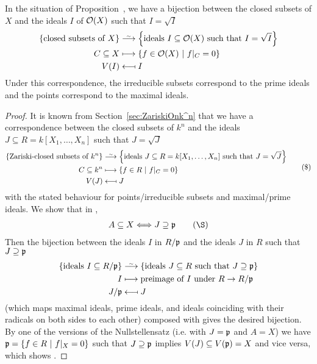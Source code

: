 \documentclass[a4paper,parskip=half,numbers=enddot, DIV=12]{scrreprt}
\begin{document}
	\begin{cor}
	 In the situation of Proposition~, we have a bijection between the closed subsets of $X$ and the ideals $I$ of $\mathcal{O}(X)$ such that $I=\sqrt{I}$
	 \begin{align*}
	 	\left\{\text{closed subsets of } X\right\}&\isomorphism\left\{	 	\text{ideals }I\subseteq\Oo(X)\text{ such that }I=\sqrt{I}
	 	\right\}\\
	   C\subseteq X &\longmapsto \left\{f\in\Oo(X)\st f|_C =0\right\}\\
	   V(I) &\longmapsfrom I
	 \end{align*}
	 Under this correspondence, the irreducible subsets correspond to the prime ideals and the points correspond to the maximal ideals.
	\end{cor}
	\begin{proof}
	 It is known from Section~\ref{sec:ZariskiOnk^n} that we have a correspondence between the closed subsets of $k^n$ and the ideals $J\subseteq R=  k[X_1,\ldots,X_n]$ such that $J=\sqrt{J}$
	 \begin{align*}\lbl{eq:correspondenceClosedIdeals}
	 \begin{split}
	 \left\{\text{Zariski-closed subsets of }k^n\right\}&\isomorphism\left\{\text{ideals }J\subseteq R=k[X_1,\ldots,X_n]\text{ such that }J=\sqrt J\right\}\\
	 C\subseteq k^n &\longmapsto \left\{f\in R\st f|_C =0\right\}\\
	 V(J) &\longmapsfrom J 
	 \end{split}\tag{\$} 
	 \end{align*}
	 with the stated behaviour for points/irreducible subsets and maximal/prime ideals. We show that in ,
	 \begin{align*}\lbl{eq:cor2.2.2+}
	   A\subseteq X \Longleftrightarrow J\supseteq \pp \tag{\S}
	 \end{align*}
	 Then the bijection between the ideals $I$ in $R/\mathfrak{p}$ and the ideals $J$ in $R$ such that $J\supseteq \mathfrak{p}$ 
	 \begin{align*}
	 \left\{\text{ideals }I\subseteq R/\pp\right\}&\isomorphism\left\{\text{ideals }J\subseteq R\text{ such that }J\supseteq\pp\right\}\\
	 I&\longmapsto \text{preimage of }I\text{ under }R\to R/\pp\\
	 J/\pp &\longmapsfrom J
	 \end{align*}
	 (which maps maximal ideals, prime ideals, and ideals coinciding with their radicals on both sides to each other) composed with  gives the desired bijection. By one of the versions of the Nullstellensatz (i.e.  with $J=\mathfrak{p}$ and $A=X$) we have $\mathfrak{p} =\left\{f\in R\ \middle|\  f|_X =0\right\}$ such that $J\supseteq \mathfrak{p}$ implies $V(J)\subseteq V(\mathfrak{p}) = X$ and vice versa, which shows .
	\end{proof}
\end{document}
